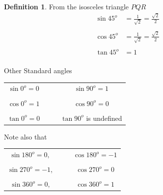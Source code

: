 \documentclass[11pt,a4paper]{article}
\theoremstyle{definition}
\newtheorem{definition}[thm]{Definition}
\begin{document}
\begin{definition}
From the  isosceles triangle $PQR$ 
\begin{align*}
\sin 45^o & = \frac{1}{\sqrt{2}} = \frac{\sqrt{2}}{2}\\\\
\cos 45^o & = \frac{1}{\sqrt{2}} = \frac{\sqrt{2}}{2}\\\\
\tan 45^o & = 1\\
\end{align*}





Other Standard angles\\
\begin{table}[H]
\begin{tabular}{cccc}
$\sin 0^o = 0$ &&& $\sin 90^o = 1$\\
&&&\\
$\cos 0^o = 1$ &&& $\cos 90^o = 0$\\
&&&\\
$\tan 0^o = 0$ &&& $\tan 90^o$ is undefined\\
\end{tabular}
\end{table}
\vspace{1.4cm}









Note also that 
\begin{table}[H]
\begin{tabular}{cccc}
$\sin 180^o = 0,$ &&& $\cos 180^o = -1$\\
&&&\\
$\sin 270^o = -1$, &&& $\cos 270^o = 0$\\
&&&\\
$\sin 360^o = 0$, &&& $\cos 360^o = 1$\\
\end{tabular}
\end{table}
\vspace{1.5cm}






\end{definition}
\end{document}
